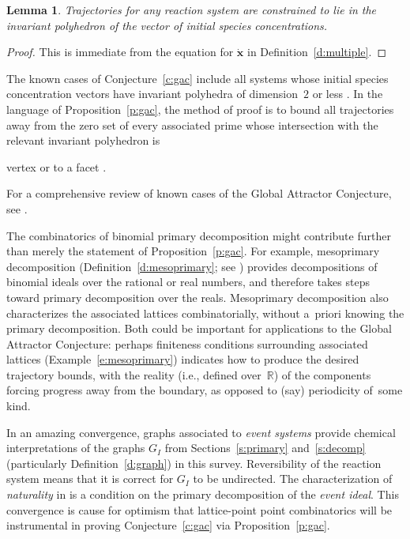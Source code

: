 \documentclass[12pt]{amsart}
\numberwithin{equation}{section}
\newtheorem{lemma}[thm]{Lemma}
\theoremstyle{definition}
\begin{document}
\begin{lemma}\label{l:stoichiometric}
Trajectories for any reaction system are constrained to lie in the
invariant polyhedron of the vector of initial species concentrations.
\end{lemma}
\begin{proof}
This is immediate from the equation for $\dot{\mathbf{x}}$ in
Definition~\ref{d:multiple}.
\end{proof}

The known cases of Conjecture~\ref{c:gac} include all systems whose
initial species concentration vectors have invariant polyhedra of
dimension~$2$ or less \cite[Corollary~4.7]{AS09}.  In the language of
Proposition~\ref{p:gac}, the method of proof is to bound all
trajectories away from the zero set of every associated prime whose
intersection with the relevant invariant polyhedron is
\begin{itemize}
\itema vertex \cite{dfanderson08,toricDynamicalSystems09} or
\iteminterior to a facet \cite{AS09}.
\end{itemize}
For a comprehensive review of known cases of the Global Attractor
Conjecture, see \cite[\S1 and~\S4]{AS09}.

The combinatorics of binomial primary decomposition might contribute
further than merely the statement of Proposition~\ref{p:gac}.  For
example, mesoprimary decomposition (Definition~\ref{d:mesoprimary};
see \cite{mesoprimary}) provides decompositions of binomial ideals
over the rational or real numbers, and therefore takes steps toward
primary decomposition over the reals.  Mesoprimary decomposition also
characterizes the associated lattices combinatorially, without
a~priori knowing the primary decomposition.  Both could be important
for applications to the Global Attractor Conjecture: perhaps
finiteness conditions surrounding associated lattices
(Example~\ref{e:mesoprimary}) indicates how to produce the desired
trajectory bounds, with the reality (i.e., defined over~${\mathbb{R}}$) of the
components forcing progress away from the boundary, as opposed to
(say) periodicity of~some kind.

In an amazing convergence, graphs associated to \emph{event systems}
\cite[Definition~2.9]{mass-actionReview} provide chemical
interpretations of the graphs $G_I$ from Sections~\ref{s:primary}
and~\ref{s:decomp} (particularly Definition~\ref{d:graph}) in this
survey.  Reversibility of the reaction system means that it is correct
for $G_I$ to be undirected.  The characterization of
\emph{naturality}\/ in \cite[Theorem~5.1]{mass-actionReview} is a
condition on the primary decomposition of the \emph{event ideal}.
This convergence is cause for optimism that lattice-point point
combinatorics will be instrumental in proving Conjecture~\ref{c:gac}
via Proposition~\ref{p:gac}.
\end{document}

